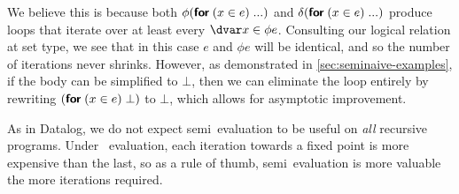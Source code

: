 We believe this is because both $\phi(\textsf{\bfseries for}_{}\:({{x} \in e})\; ...)$ and $\delta(\textsf{\bfseries for}_{}\:({{x} \in e})\;
...)$ produce loops that iterate over at least every $\dvar x \in \phi e$.
Consulting our logical relation at set type, we see that in this case $e$ and
$\phi e$ will be identical, and so the number of iterations never shrinks.
However, as demonstrated in \cref{sec:seminaive-examples}, if the body can be
simplified to $\bot$, then we can eliminate the loop entirely by rewriting
$(\textsf{\bfseries for}_{}\:({{x} \in e})\; \bot)$ to $\bot$, which allows for asymptotic improvement.

As in Datalog, we do not expect semi\naive\ evaluation to be useful on
\emph{all} recursive programs. Under \naive\ evaluation, each iteration towards
a fixed point is more expensive than the last, so as a rule of thumb,
semi\naive\ evaluation is more valuable the more iterations required.

